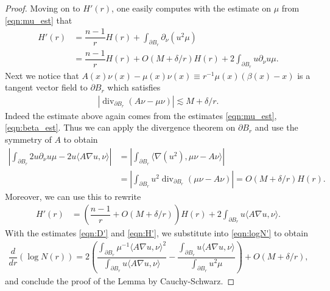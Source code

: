 \documentclass[10pt,a4paper]{amsart}
\DeclareMathOperator{\divv}{\mathrm{div}}
\newcommand{\abs}[1]{\left \lvert #1 \right \rvert}
\begin{document}
\begin{proof}
		Moving on to $H'(r)$, one easily computes with the estimate on $\mu$ from \eqref{eqn:mu_est} that 
		\begin{align*}
			H'(r) & = \dfrac{n-1}{r} H(r) + \int_{\partial B_r} \partial_\nu ( u^2 \mu) \\
			& = \dfrac{n-1}{r} H(r) + O(M + \delta/r) H(r) + 2\int_{\partial B_r} u \partial_\nu u \mu. 
		\end{align*}
		Next we notice that $A(x) \nu(x) - \mu(x) \nu(x) \equiv r^{-1} \mu(x) (\beta(x) - x)$ is a tangent vector field to $\partial B_r$ which satisfies
		\begin{align*}
			\abs{\divv_{\partial B_r} (A\nu - \mu \nu)} \lesssim M + \delta/r.
		\end{align*}
		Indeed the estimate above again comes from the estimates \eqref{eqn:mu_est}, \eqref{eqn:beta_est}. Thus we can apply the divergence theorem on $\partial B_r$ and use the symmetry of $A$ to obtain
		\begin{align*}
			\abs{ \int_{\partial B_r} 2 u \partial_\nu u \mu  - 2 u \langle A \nabla u, \nu \rangle } & = \abs{ \int_{\partial B_r} \langle \nabla (u^2), \mu \nu - A \nu \rangle   } \\
			& = \abs{ \int_{\partial B_r}  u^2 \divv_{\partial B_r}(\mu \nu - A \nu) } = O(M + \delta/r) H(r).
		\end{align*}
		Moreover, we can use this to rewrite
		\begin{align}\label{eqn:H'}
			H'(r) & = \left( \dfrac{n-1}{r} + O(M + \delta/r) \right) H(r) + 2 \int_{\partial B_r} u \langle A \nabla u, \nu \rangle. 
		\end{align}
		With the estimates \eqref{eqn:D'} and \eqref{eqn:H'}, we substitute into \eqref{eqn:logN'} to obtain
		\begin{align*}
			\dfrac{d}{dr} \left( \log N(r) \right) = 2 \left( \dfrac{\int_{\partial B_r} \mu^{-1} \langle A \nabla u, \nu \rangle^2 }{ \int_{\partial B_r} u \langle A \nabla u, \nu \rangle }  - \dfrac{  \int_{\partial B_r} u \langle A \nabla u, \nu \rangle }{  \int_{\partial B_r} u^2 \mu   }\right) + O(M + \delta/r),
		\end{align*}
		and conclude the proof of the Lemma by Cauchy-Schwarz. 
	\end{proof}
\end{document}
